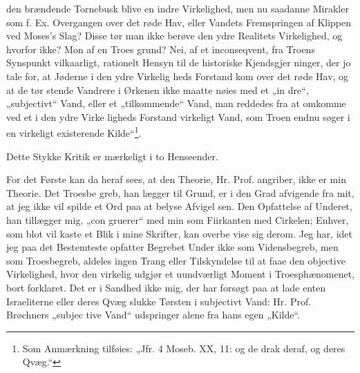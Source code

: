 \documentclass[12pt]{book}
\newcommand{\opage}[1]{\marginnote{\footnotesize\textit{[#1]}}}
\begin{document}
den brændende Tornebusk blive en indre Virkelighed,
men nu saadanne Mirakler som f. Ex. Overgangen over
det røde Hav, eller Vandets Fremspringen af Klippen
ved Moses's Slag? Disse tør man ikke berøve den ydre
Realitets Virkelighed, og hvorfor ikke? Mon af en Troes\-%
grund? Nei, af et inconseqvent, fra Troens Synspunkt
vilkaarligt, rationelt Hensyn til de historiske Kjendsgjer\-%
ninger, der jo tale for, at Jøderne i den ydre Virkelig\-%
heds Forstand kom over det røde Hav, og at de tør\-%
stende Vandrere i Ørkenen ikke maatte nøies med et „in\-%
dre“, „subjectivt“ Vand, eller et „tilkommende“ Vand,
man reddedes fra at omkomme ved et i den ydre Virke\-%
ligheds Forstand virkeligt Vand, som Troen endnu søger
i en virkeligt existerende Kilde“\footnote{Som Anmærkning tilføies: „Jfr. 4 Moseb. XX, 11: og de drak
deraf, og deres Qvæg.“ %
}.

Dette Stykke Kritik er mærkeligt i to Henseender.

For det Første kan da heraf sees, at den Theorie,
Hr. Prof. angriber, ikke er min Theorie. Det Troesbe\-%
greb, han lægger til Grund, er i den Grad afvigende fra
mit, at jeg ikke vil spilde et Ord paa at belyse Afvigel\-%
sen. Den Opfattelse af Underet, han tillægger mig, „con\-%
gruerer“ med min som Fiirkanten med Cirkelen; Enhver,
som blot vil kaste et Blik i mine Skrifter, kan overbe\-%
vise sig derom. Jeg har, idet jeg paa det Bestemteste
opfatter Begrebet Under ikke som Vidensbegreb, men
som Troesbegreb, aldeles ingen Trang eller Tilskyndelse
til at faae den objective Virkelighed, hvor den virkelig
udgjør et uundværligt Moment i Troesphænomenet, bort\-%
forklaret. Det er i Sandhed ikke mig, der har forsøgt
paa at lade enten Israeliterne eller deres Qvæg slukke
\opage{7}\setcounter{footnote}{0}%
Tørsten i subjectivt Vand: Hr. Prof. Brøchners „subjec\-%
tive Vand“ udspringer alene fra hans egen „Kilde“.
\end{document}
